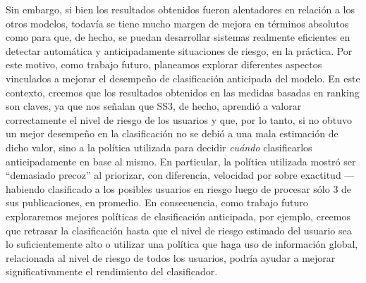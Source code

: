 Sin embargo, si bien los resultados obtenidos fueron alentadores en relación a los otros modelos, todavía se tiene mucho margen de mejora en términos absolutos como para que, de hecho, se puedan desarrollar sistemas realmente eficientes en detectar automática y anticipadamente situaciones de riesgo, en la práctica.
Por este motivo, como trabajo futuro, planeamos explorar diferentes aspectos vinculados a mejorar el desempeño de clasificación anticipada del modelo.
En este contexto, creemos que los resultados obtenidos en las medidas basadas en ranking son claves, ya que nos señalan que SS3, de hecho, aprendió a valorar correctamente el nivel de riesgo de los usuarios y que, por lo tanto, si no obtuvo un mejor desempeño en la clasificación no se debió a una mala estimación de dicho valor, sino a la política utilizada para decidir \emph{cuándo} clasificarlos anticipadamente en base al mismo.
En particular, la política utilizada mostró ser ``demasiado precoz'' al  priorizar, con diferencia, velocidad por sobre exactitud ---habiendo clasificado a los posibles usuarios en riesgo luego de procesar sólo 3 de sus publicaciones, en promedio.
En consecuencia, como trabajo futuro exploraremos mejores políticas de clasificación anticipada, por ejemplo, creemos que retrasar la clasificación hasta que el nivel de riesgo estimado del usuario sea lo suficientemente alto o utilizar una política que haga uso de información global, relacionada al nivel de riesgo de todos los usuarios, podría ayudar a mejorar significativamente el rendimiento del clasificador.
